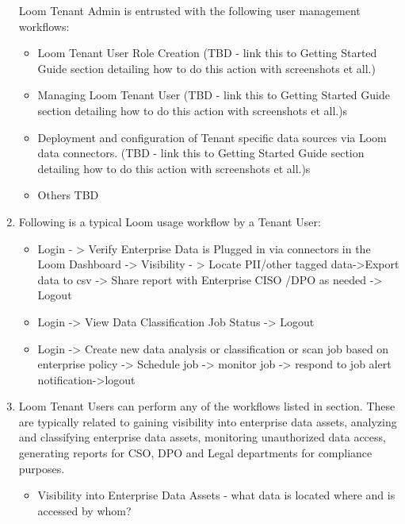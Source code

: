 \documentclass[letterpaper,10pt,english]{sphinxmanual}
\begin{document}
\begin{enumerate}
Loom Tenant Admin is entrusted with the following user management workflows:
\begin{itemize}
\item {} 
Loom Tenant User Role Creation  (TBD - link this to Getting Started Guide section detailing how to do this action with screenshots et all.)

\item {} 
Managing Loom Tenant User  (TBD - link this to Getting Started Guide section detailing how to do this action with screenshots et all.)s

\item {} 
Deployment and configuration of Tenant specific data sources via Loom data connectors. (TBD - link this to Getting Started Guide section detailing how to do this action with screenshots et all.)s

\item {} 
Others TBD

\end{itemize}

\item {} 

Following is a typical Loom usage workflow by a Tenant User:
\begin{itemize}
\item {} 
Login - \textgreater{} Verify Enterprise Data is Plugged in via connectors in the Loom Dashboard -\textgreater{} Visibility - \textgreater{} Locate PII/other tagged data-\textgreater{}Export data to csv -\textgreater{} Share report with Enterprise CISO /DPO as needed -\textgreater{} Logout

\item {} 
Login -\textgreater{} View Data Classification Job Status -\textgreater{} Logout

\item {} 
Login -\textgreater{} Create new data analysis or classification or scan job based on enterprise policy -\textgreater{} Schedule job -\textgreater{} monitor job -\textgreater{} respond to job alert notification-\textgreater{}logout

\end{itemize}

\item {} 

Loom Tenant Users can perform any of the workflows listed in {\hyperref[\detokenize{loom_getting_started_guide:usage-wf-datavision}]{}} section.  These are typically related to gaining visibility into enterprise data assets, analyzing and classifying enterprise data assets, monitoring unauthorized data access, generating reports for CSO, DPO and Legal departments for compliance purposes.
\begin{itemize}
\item {} 
Visibility into Enterprise Data Assets - what data is located where and is accessed by whom?


\end{itemize}
\end{enumerate}
\end{document}
